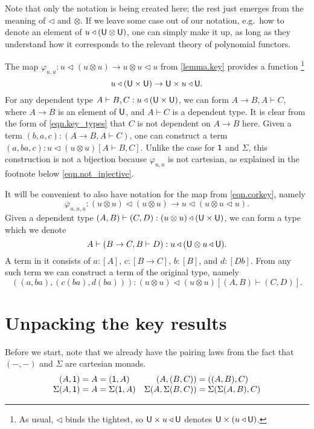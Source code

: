 \documentclass[11pt, one side, article]{memoir}
\theoremstyle{definition}
\theoremstyle{plain}
\newcommand{\tn}[1]{\textnormal{#1}}
\newcommand{\ol}[1]{\overline{#1}}
\newcommand{\0}{\textsf{0}}
\newcommand{\1}{\tn{\textsf{1}}}
\newcommand{\U}{\tn{\textsf{U}}}
\newcommand{\tri}{\mathbin{\triangleleft}}
\begin{document}
Note that only the notation is being created here; the rest just emerges from the meaning of $\tri$ and $\otimes$. If we leave some case out of our notation, e.g.\ how to denote an element of $u\tri(\U\otimes\U)$, one can simply make it up, as long as they understand how it corresponds to the relevant theory of polynomial functors.

The map $\varphi_{u,u}\colon u\tri (u\otimes u)\to u\otimes u\tri u$ from \cref{lemma.key} provides a function%
\footnote{As usual, $\tri$ binds the tightest, so $\U\times u\tri \U$ denotes $\U\times(u\tri \U)$.}
\begin{equation}\label{eqn.key_types}
	u\tri(\U\times\U)\to \U\times u\tri \U.
\end{equation}
For any dependent type $A\vdash B,C:u\tri(\U\times\U)$, we can form $A\to B,A\vdash C$, where $A\to B$ is an element of $\U$, and $A\vdash C$ is a dependent type. It is clear from the form of \eqref{eqn.key_types} that $C$ is not dependent on $A\to B$ here. Given a term $(b,a,c):(A\to B,A\vdash C)$, one can construct a term $(a,ba,c):u\tri(u\otimes u)[A\vdash B,C]$. Unlike the case for $\1$ and $\Sigma$, this construction is not a bijection because $\varphi_{u,u}$ is not cartesian, as explained in the footnote below \eqref{eqn.not_injective}.

It will be convenient to also have notation for the map from \eqref{eqn.corkey}, namely
\[\ol\varphi_{u,u,u}\colon (u\otimes u)\tri(u\otimes u)\to u\tri(u\otimes u\tri u).\]
Given a dependent type $(A,B)\vdash(C,D):(u\otimes u)\tri(\U\times \U)$, we can form a type which we denote 
\[A\vdash(B\to C,B\vdash D):u\tri(\U\otimes u\tri \U).\]
A term in it consists of $a:[A]$, $c:[B\to C]$, $b:[B]$, and $d:[Db]$. From any such term we can construct a term of the original type, namely
\[((a,ba),(c(ba), d(ba))):(u\otimes u)\tri(u\otimes u)[(A,B)\vdash(C,D)].\]

\section{Unpacking the key results}


Before we start, note that we already have the pairing laws from the fact that $(-,-)$ and $\Sigma$ are cartesian monads.
\[
\begin{array}{cc}
	(A,\1)=A=(\1,A)&(A,(B,C))=((A,B),C)\\
	\Sigma(A,\1)=A=\Sigma(\1,A)&
		\Sigma(A,\Sigma(B,C))=\Sigma(\Sigma(A,B),C)
\end{array}
\]
\end{document}
